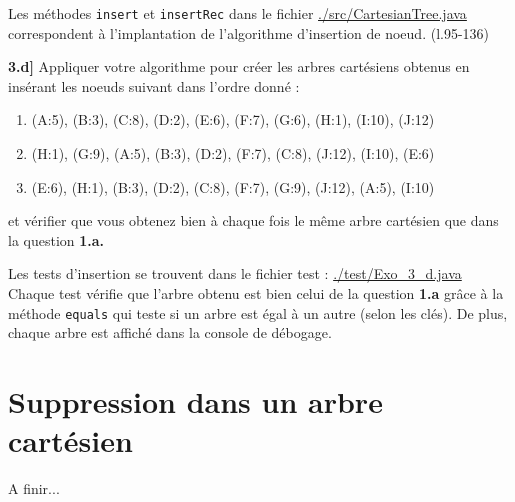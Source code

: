 \documentclass[a4paper,12pt]{report}
\begin{document}
\begin{tcolorbox}[colback=gray!10, colframe=blue!30, coltitle=black, title=Réponse à la 3.c - 1/1]

    Les méthodes \texttt{insert} et \texttt{insertRec} dans le fichier \href{./src/CartesianTree.java}{./src/CartesianTree.java} correspondent à l'implantation de l'algorithme d'insertion de noeud. (l.95-136)

\end{tcolorbox}




\vspace{1.5cm}

\textbf{3.d]} Appliquer votre algorithme pour créer les arbres cartésiens obtenus en insérant les noeuds suivant dans l'ordre donné :
\begin{enumerate}
    \item (A:5), (B:3), (C:8), (D:2), (E:6), (F:7), (G:6), (H:1), (I:10), (J:12)
    \item (H:1), (G:9), (A:5), (B:3), (D:2), (F:7), (C:8), (J:12), (I:10), (E:6)
    \item (E:6), (H:1), (B:3), (D:2), (C:8), (F:7), (G:9), (J:12), (A:5), (I:10)
\end{enumerate}
et vérifier que vous obtenez bien à chaque fois le même arbre cartésien que dans la question \textbf{1.a.}

\begin{tcolorbox}[colback=gray!10, colframe=blue!30, coltitle=black, title=Réponse à la 3.d - 1/1]

    Les tests d'insertion se trouvent dans le fichier test : \href{./test/Exo\_3\_d.java}{./test/Exo\_3\_d.java}\\

    Chaque test vérifie que l'arbre obtenu est bien celui de la question \textbf{1.a} grâce à la méthode \texttt{equals} qui teste si un arbre est égal à un autre (selon les clés). De plus, chaque arbre est affiché dans la console de débogage. 

\end{tcolorbox}






\newpage

\renewcommand{\chaptername}{Exercice}
\chapter{Suppression dans un arbre cartésien}

A finir...
\end{document}

